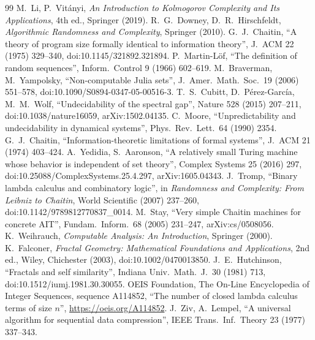 \documentclass[11pt]{article}
\theoremstyle{definition}\newtheorem{definition}{Definition}[section]
\theoremstyle{remark}\newtheorem*{remark}{Remark}
\begin{document}
\begingroup\raggedright
\begin{thebibliography}{99}
 M.~Li, P.~Vit\'anyi, \emph{An Introduction to Kolmogorov Complexity and Its Applications}, 4th ed., Springer (2019).
 R.~G.~Downey, D.~R.~Hirschfeldt, \emph{Algorithmic Randomness and Complexity}, Springer (2010).
 G.~J.~Chaitin, ``A theory of program size formally identical to information theory'', J.\ ACM 22 (1975) 329--340, doi:10.1145/321892.321894.
 P.~Martin-L\"of, ``The definition of random sequences'', Inform.\ Control 9 (1966) 602--619.
 M.~Braverman, M.~Yampolsky, ``Non-computable Julia sets'', J.\ Amer.\ Math.\ Soc.\ 19 (2006) 551--578, doi:10.1090/S0894-0347-05-00516-3.
 T.~S.~Cubitt, D.~P\'erez-Garc\'ia, M.~M.~Wolf, ``Undecidability of the spectral gap'', Nature 528 (2015) 207--211, doi:10.1038/nature16059, arXiv:1502.04135.
 C.~Moore, ``Unpredictability and undecidability in dynamical systems'', Phys.\ Rev.\ Lett.\ 64 (1990) 2354.
 G.~J.~Chaitin, ``Information-theoretic limitations of formal systems'', J.\ ACM 21 (1974) 403--424.
 A.~Yedidia, S.~Aaronson, ``A relatively small Turing machine whose behavior is independent of set theory'', Complex Systems 25 (2016) 297, doi:10.25088/ComplexSystems.25.4.297, arXiv:1605.04343.
 J.~Tromp, ``Binary lambda calculus and combinatory logic'', in \emph{Randomness and Complexity: From Leibniz to Chaitin}, World Scientific (2007) 237--260, doi:10.1142/9789812770837\_0014.
 M.~Stay, ``Very simple Chaitin machines for concrete AIT'', Fundam.\ Inform.\ 68 (2005) 231--247, arXiv:cs/0508056.
 K.~Weihrauch, \emph{Computable Analysis: An Introduction}, Springer (2000).
 K.~Falconer, \emph{Fractal Geometry: Mathematical Foundations and Applications}, 2nd ed., Wiley, Chichester (2003), doi:10.1002/0470013850.
 J.~E.~Hutchinson, ``Fractals and self similarity'', Indiana Univ.\ Math.\ J.\ 30 (1981) 713, doi:10.1512/iumj.1981.30.30055.
 OEIS Foundation, The On-Line Encyclopedia of Integer Sequences, sequence A114852, ``The number of closed lambda calculus terms of size $n$'', \url{https://oeis.org/A114852}.
 J.~Ziv, A.~Lempel, ``A universal algorithm for sequential data compression'', IEEE Trans.\ Inf.\ Theory 23 (1977) 337--343.
\end{thebibliography}
\endgroup
\end{document}
